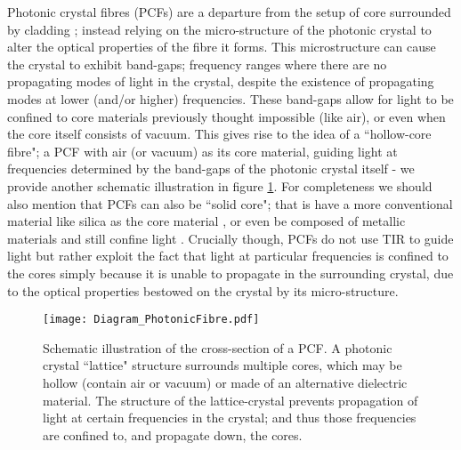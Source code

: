 Photonic crystal fibres (PCFs) are a departure from the setup of core surrounded by cladding \cite{russell2003photonic}; instead relying on the micro-structure of the photonic crystal to alter the optical properties of the fibre it forms.
This microstructure can cause the crystal to exhibit band-gaps; frequency ranges where there are no propagating modes of light in the crystal, despite the existence of propagating modes at lower (and/or higher) frequencies.
These band-gaps allow for light to be confined to core materials previously thought impossible (like air), or even when the core itself consists of vacuum.
This gives rise to the idea of a ``hollow-core fibre"; a PCF with air (or vacuum) as its core material, guiding light at frequencies determined by the band-gaps of the photonic crystal itself - we provide another schematic illustration in figure \ref{fig:Diagram_PhotonicFibre}.
For completeness we should also mention that PCFs can also be ``solid core"; that is have a more conventional material like silica as the core material \cite{hou2008metallic}, or even be composed of metallic materials and still confine light \cite{luan2004allsolid}.
Crucially though, PCFs do not use TIR to guide light but rather exploit the fact that light at particular frequencies is confined to the cores simply because it is unable to propagate in the surrounding crystal, due to the optical properties bestowed on the crystal by its micro-structure. \newline
\begin{figure}[h]
	\centering
	\texttt{[image: Diagram\_PhotonicFibre.pdf]}
	\caption{\label{fig:Diagram_PhotonicFibre} Schematic illustration of the cross-section of a PCF. A photonic crystal ``lattice" structure surrounds multiple cores, which may be hollow (contain air or vacuum) or made of an alternative dielectric material. The structure of the lattice-crystal prevents propagation of light at certain frequencies in the crystal; and thus those frequencies are confined to, and propagate down, the cores.}
\end{figure}

